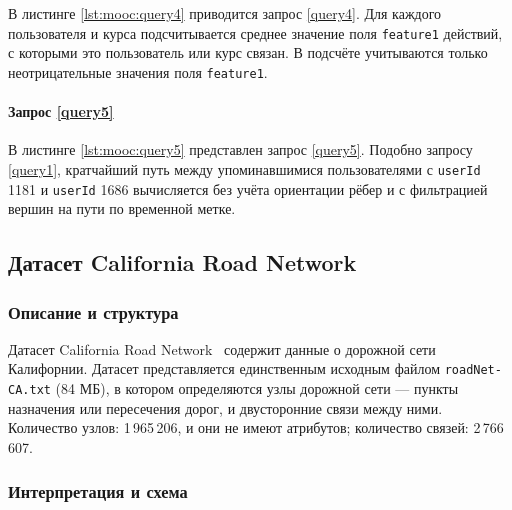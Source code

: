 В листинге \ref{lst:mooc:query4} приводится запрос \ref{query4}. Для каждого пользователя и курса подсчитывается
среднее значение поля \texttt{feature1} действий, с которыми это пользователь или курс связан. В подсчёте учитываются
только неотрицательные значения поля \texttt{feature1}.

\paragraph{Запрос \ref{query5}}

В листинге \ref{lst:mooc:query5} представлен запрос \ref{query5}. Подобно запросу \ref{query1}, кратчайший путь между
упоминавшимися пользователями с \texttt{userId} 1181 и \texttt{userId} 1686 вычисляется без учёта ориентации рёбер и с
фильтрацией вершин на пути по временной метке.

\subsection{Датасет California Road Network}

\subsubsection{Описание и структура}

Датасет California Road Network~\cite{roadnet} содержит данные о дорожной сети Калифорнии. Датасет представляется
единственным исходным файлом \texttt{roadNet-CA.txt} (84 МБ), в котором определяются узлы дорожной сети --- пункты
назначения или пересечения дорог, и двусторонние связи между ними. Количество узлов: 1\,965\,206, и они не имеют
атрибутов; количество связей: 2\,766\,607.

\subsubsection{Интерпретация и схема}

